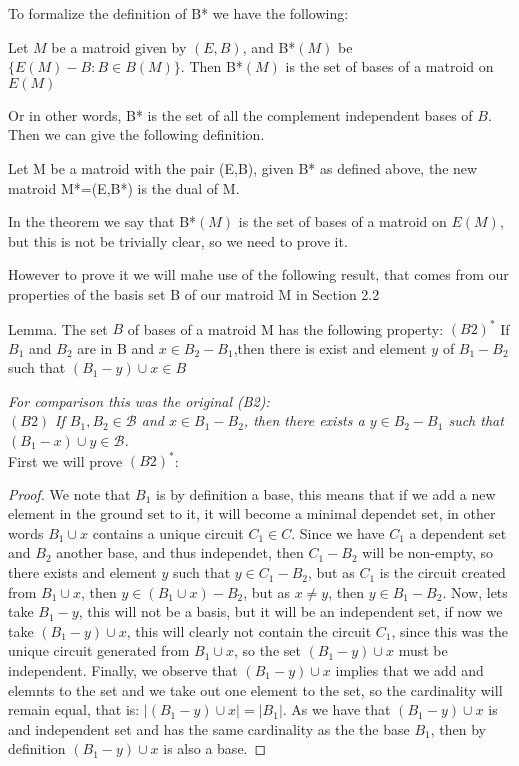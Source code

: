 To formalize the definition of B* we have the following:
\begin{theorem}
    Let $M$ be a matroid given by $(E,B)$, and B*$(M)$ be $\{E(M) - B:B\in B(M)\}$. Then B*$(M)$ is the set of bases of a matroid on $E(M)$
\end{theorem}

Or in other words, B* is the set of all the complement independent bases of $B$. Then we can give the following definition.

\begin{defn}
    Let M be a matroid with the pair (E,B), given B* as defined above, the new matroid M*=(E,B*) is the dual of M.
\end{defn}

In the theorem we say that B*$(M)$ is the set of bases of a matroid on $E(M)$, but this is not be trivially clear, so we need to prove it.

However to prove it we will mahe use of the following result, that comes from our properties of the basis set B of our matroid M in Section 2.2

Lemma. The set $B$ of bases of a matroid M has the following property:
$(B2)^*$ If $B_1$ and $B_2$ are in B and $x \in B_2 - B_1$,then there is exist and element $y$ of $B_1 - B_2$ such that $(B_1 - y) \cup x \in B$

\textit{For comparison this was the original (B2): \\
$(B2)$ If $B_1,B_2\in\mathcal{B}$ and $x\in B_1 - B_2$, then there exists a $y\in B_2 - B_1$ such that $(B_1 - x)\cup y \in\mathcal{B}$.}\\

First we will prove $(B2)^*$:
\begin{proof}
  We note that $B_1$ is by definition a base, this means that if we add a new element in the ground set to it, it will become a minimal dependet set, in other words $B_1 \cup x$ contains a unique circuit $C_1 \in C$. Since we have $C_1$ a dependent set and $B_2$ another base, and thus independet, then $C_1 - B_2$ will be non-empty, so there exists and element $y$ such that $y \in C_1 - B_2$, but as $C_1$ is the circuit created from $B_1 \cup x$, then $y \in (B_1 \cup x) - B_2$, but as $x \neq y$, then $y \in B_1 - B_2$. Now, lets take $B_1 - y$, this will not be a basis, but it will be an independent set, if now we take $(B_1 - y)\cup x$, this will clearly not contain the circuit $C_1$, since this was the unique circuit generated from $B_1 \cup x$, so the set $(B_1 - y)\cup x$ must be independent. Finally, we observe that $(B_1 - y)\cup x$ implies that we add and elemnts to the set and we take out one element to the set, so the cardinality will remain equal, that is: $|(B_1 - y)\cup x|=|B_1|$.
As we have that $(B_1 - y)\cup x$ is and independent set and has the same cardinality as the the base $B_1$, then by definition $(B_1 - y)\cup x$ is also a base.  
\end{proof}

